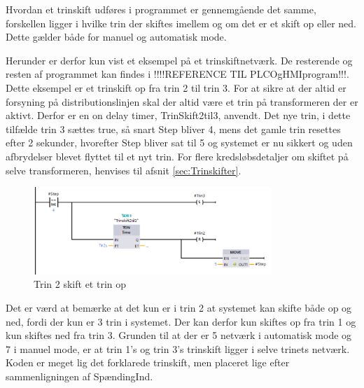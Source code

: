 Hvordan et trinskift udføres i programmet er gennemgående det samme, forskellen ligger i hvilke trin der skiftes imellem og om det er et skift op eller ned. Dette gælder både for manuel og automatisk mode.

Herunder er derfor kun vist et eksempel på et trinskiftnetværk. De resterende og resten af programmet kan findes i !!!!REFERENCE TIL PLCOgHMIprogram!!!. Dette eksempel er et trinskift op fra trin 2 til trin 3. For at sikre at der altid er forsyning på distributionslinjen skal der altid være et trin på transformeren der er aktivt. Derfor er en on delay timer, TrinSkift2til3, anvendt. Det nye trin, i dette tilfælde trin 3 sættes true, så snart Step bliver 4, mens det gamle trin resettes efter 2 sekunder, hvorefter Step bliver sat til 5 og systemet er nu sikkert og uden afbrydelser blevet flyttet til et nyt trin. For flere kredsløbsdetaljer om skiftet på selve transformeren, henvises til afsnit \ref{sec:Trinskifter}.

\begin{figure}[H] %
	\centering
	\includegraphics[width=0.8\textwidth]{Figure/Trin2SkiftOp}
	\caption{Trin 2 skift et trin op}
	\label{fig:Trin2SkiftOp}
\end{figure}

Det er værd at bemærke at det kun er i trin 2 at systemet kan skifte både op og ned, fordi der kun er 3 trin i systemet. Der kan derfor kun skiftes op fra trin 1 og kun skiftes ned fra trin 3. Grunden til at der er 5 netværk i automatisk mode og 7 i manuel mode, er at trin 1's og trin 3's trinskift ligger i selve trinets netværk. Koden er meget lig det forklarede trinskift, men placeret lige efter sammenligningen af SpændingInd.